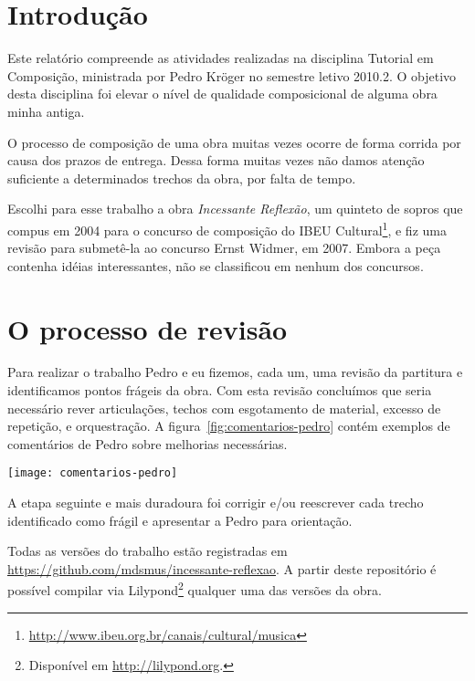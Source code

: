 \documentclass[10pt]{article}
\newcommand{\piece}[0]{\textit{Incessante Reflexão}}
\begin{document}

\section{Introdução}
\label{sec:introducao}

Este relatório compreende as atividades realizadas na disciplina
Tutorial em Composição, ministrada por Pedro Kröger no semestre letivo
2010.2.
O objetivo desta disciplina foi elevar o nível de qualidade
composicional de alguma obra minha antiga.

O processo de composição de uma obra muitas vezes ocorre de forma
corrida por causa dos prazos de entrega. Dessa forma muitas vezes não
damos atenção suficiente a determinados trechos da obra, por falta de
tempo.

Escolhi para esse trabalho a obra \piece{}, um quinteto de sopros que
compus em 2004 para o concurso de composição do IBEU
Cultural\footnote{\url{http://www.ibeu.org.br/canais/cultural/musica}},
e fiz uma revisão para submetê-la ao concurso Ernst Widmer, em
2007. Embora a peça contenha idéias interessantes, não se classificou
em nenhum dos concursos.

\section{O processo de revisão}
\label{sec:o-processo-de}

Para realizar o trabalho Pedro e eu fizemos, cada um, uma revisão da
partitura e identificamos pontos frágeis da obra. Com esta revisão
concluímos que seria necessário rever articulações, techos com
esgotamento de material, excesso de repetição, e orquestração. A
figura~\ref{fig:comentarios-pedro} contém exemplos de comentários de
Pedro sobre melhorias necessárias.

\begin{figure*}
  \centering
  \texttt{[image: comentarios-pedro]}
  \caption{Comentários de Pedro sobre melhorias necessárias}
  \label{fig:comentarios-pedro}
\end{figure*}

A etapa seguinte e mais duradoura foi corrigir e/ou reescrever cada
trecho identificado como frágil e apresentar a Pedro para orientação.

Todas as versões do trabalho estão registradas em
\url{https://github.com/mdsmus/incessante-reflexao}. A partir deste
repositório é possível compilar via Lilypond\footnote{Disponível em
  \url{http://lilypond.org}.} qualquer uma das versões da obra.
\end{document}
